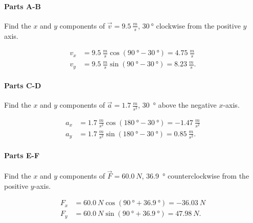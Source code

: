 \setcounter{partcounter}{2}
\paragraph{Parts A-B}

Find the $x$ and $y$ components of $\vec{v} = \SI{9.5}{\frac{m}{s}}$, $\SI{30}{\degree}$ clockwise from the positive $y$ axis.

\begin{solution}
	\begin{align*}
		v_{x} &= \SI{9.5}{\frac{m}{s}} \cos \left( \SI{90}{\degree} - \SI{30}{\degree} \right) = \SI{4.75}{\frac{m}{s}}\\
		v_{y} &= \SI{9.5}{\frac{m}{s}} \sin \left( \SI{90}{\degree} - \SI{30}{\degree} \right) = \SI{8.23}{\frac{m}{s}}
		.\end{align*}
\end{solution}

\setcounter{partcounter}{4}
\paragraph{Parts C-D}

Find the $x$ and $y$ components of $\vec{a} = \SI{1.7}{\frac{m}{s^2}}$, \SI{30}{\degree} above the negative $x$-axis.

\begin{solution}
	\begin{align*}
		a_{x} &= \SI{1.7}{\frac{m}{s^2}} \cos \left( \SI{180}{\degree} - \SI{30}{\degree} \right) = \SI{-1.47}{\frac{m}{s^2}} \\
		a_{y} &= \SI{1.7}{\frac{m}{s^2}} \sin \left( \SI{180}{\degree} - \SI{30}{\degree} \right) = \SI{0.85}{\frac{m}{s^2}}
		.\end{align*}
\end{solution}

\setcounter{partcounter}{6}
\paragraph{Parts E-F}

Find the $x$ and $y$ components of $\vec{F} = \SI{60.0}{N}$, \SI{36.9}{\degree} counterclockwise from the positive $y$-axis.

\begin{solution}
	\begin{align*}
		F_{x} &= \SI{60.0}{N} \cos \left( \SI{90}{\degree} + \SI{36.9}{\degree} \right) = \SI{-36.03}{N} \\
		F_{y} &= \SI{60.0}{N} \sin \left( \SI{90}{\degree} + \SI{36.9}{\degree} \right) = \SI{47.98}{N}
		.\end{align*}
\end{solution}


